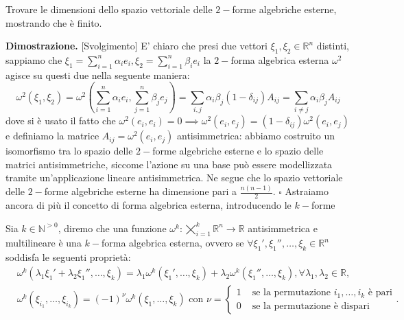 %
\vspace{0.5cm}
\begin{exercise}
    Trovare le dimensioni dello spazio vettoriale delle $2-$forme algebriche esterne, mostrando che è finito.
\end{exercise}
%
\noindent \textbf{Dimostrazione. } [Svolgimento]
    E' chiaro che presi due vettori $\xi_1, \xi_2 \in \mathbb{R}^n$ distinti, sappiamo che $\xi_1 = \sum\limits_{i=1}^n \alpha_i e_i, \xi_2 = \sum\limits_{i=1}^n \beta_i e_i$ la $2-$forma algebrica esterna $\omega^2$ agisce su questi due nella seguente maniera:
    $$
        \omega^2(\xi_1, \xi_2) = \omega^2(\sum_{i=1}^n \alpha_i e_i, \sum_{j=1}^n \beta_j e_j) = \sum_{i, j} \alpha_i \beta_j (1-\delta_{ij}) A_{ij} = \sum_{i \neq j} \alpha_i \beta_j A_{ij}
    $$
    dove si è usato il fatto che $\omega^2(e_i, e_i) = 0 \implies \omega^2(e_i, e_j) = (1-\delta_{ij}) \omega^2(e_i, e_j)$ e definiamo la matrice $A_{ij} = \omega^2(e_i, e_j)$ antisimmetrica: abbiamo costruito un isomorfismo tra lo spazio delle $2-$forme algebriche esterne e lo spazio delle matrici antisimmetriche, siccome l'azione su una base può essere modellizzata tramite un'applicazione lineare antisimmetrica. Ne segue che lo spazio vettoriale delle $2-$forme algebriche esterne ha dimensione pari a $\frac{n(n-1)}{2}$.
\hfill $\square$
%
Astraiamo ancora di più il concetto di forma algebrica esterna, introducendo le $k-$forme
%
\vspace{0.5cm}
\begin{definition}[\textcolor{blue}{$k-$forma algebrica esterna}]
    Sia $k \in \mathbb{N}^{> 0}$, diremo che una funzione $\omega^k: \varprod\limits_{i=1}^k \mathbb{R}^n \to \mathbb{R}$ antisimmetrica e multilineare è una $k-$forma algebrica esterna, ovvero se $\forall \xi_1', \xi_1'', \ldots, \xi_k \in \mathbb{R}^n$ soddisfa le seguenti proprietà:
    \[\begin{aligned}
        &\omega^k(\lambda_1 \xi_1' + \lambda_2 \xi_1'', \ldots, \xi_k) = \lambda_1 \omega^k(\xi_1', \ldots, \xi_k) + \lambda_2 \omega^k(\xi_1'', \ldots, \xi_k), \forall \lambda_1, \lambda_2 \in \mathbb{R}, \\
        &\omega^k(\xi_{i_1}, \ldots, \xi_{i_k}) = (-1)^{\nu} \omega^k(\xi_1, \ldots, \xi_k) \text{ con } \nu = \begin{cases} 1 & \text{ se la permutazione } i_1, \ldots, i_k \text{ è pari} \\ 0 & \text{ se la permutazione è dispari } \end{cases}.
    \end{aligned}\]
\end{definition}
